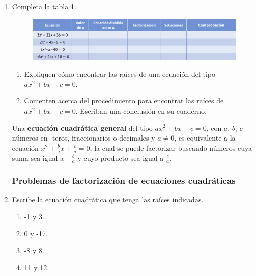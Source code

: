 \documentclass[11pt]{book}
\begin{document}
\begin{enumerate}
    \item Completa la tabla \ref{tab:table2.9}.

          \begin{figure}[H]
              \centering
              \includegraphics[width=\textwidth]{table2.9.png}
              \label{tab:table2.9}
          \end{figure}

          \begin{enumerate}
              \item Expliquen cómo encontrar las raíces de una ecuación del tipo $ax^2 + bx + c = 0$.
              \item Comenten acerca del procedimiento para encontrar las raíces de $ax^2 + bx + c = 0$. Escriban una conclusión en su cuaderno.
          \end{enumerate}

          \begin{boxH}
              Una \textbf{ecuación cuadrática general} del tipo $ax^2 + bx + c = 0$, con $a$, $b$, $c$ números en-
              teros, fraccionarios o decimales y $a \neq 0$, es equivalente a la ecuación $x^2 + \frac{b}{a} x + \frac{c}{a} = 0$,
              la cual se puede factorizar buscando números cuya suma sea igual a $-\frac{b}{a}$ y cuyo
              producto sea igual a $\frac{c}{a}$.
          \end{boxH}

          \subsubsection{Problemas de factorización de ecuaciones cuadráticas}

    \item Escribe la ecuación cuadrática que tenga las raíces indicadas.
          \begin{enumerate}
              \item -1 y 3.
              \item 0 y -17.
              \item -8 y 8.
              \item 11 y 12.
          \end{enumerate}


\end{enumerate}
\end{document}
